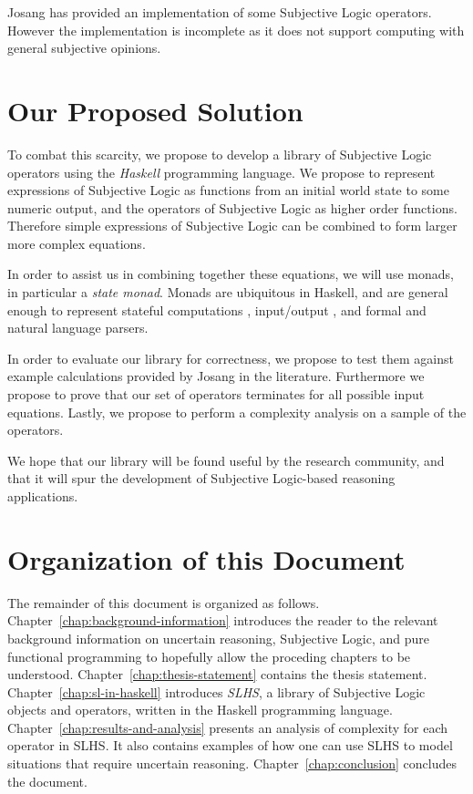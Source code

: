 \documentclass[thesis.tex]{subfiles}
\begin{document}
Josang has provided an implementation of some Subjective Logic operators.
However the implementation is incomplete as it does not support computing
with general subjective opinions.





\section{Our Proposed Solution}

To combat this scarcity, we propose to develop a library of Subjective Logic
operators using the \emph{Haskell} programming language. We propose to represent
expressions of Subjective Logic as functions from an initial world state to some
numeric output, and the operators of Subjective Logic as higher order functions.
Therefore simple expressions of Subjective Logic can be combined to form larger
more complex equations.

In order to assist us in combining together these equations, we will use monads,
in particular a \emph{state monad}. Monads are ubiquitous in Haskell, and are
general enough to represent stateful computations \cite{launchbury1994lazy},
input/output \cite{peyton1993imperative},
and formal \cite{hutton1998monadic, leijen2001parsec} and natural language
\cite{hafiz2010lazy} parsers.

In order to evaluate our library for correctness, we propose to test them against
example calculations provided by Josang in the literature. Furthermore we propose
to prove that our set of operators terminates for all possible input equations.
Lastly, we propose to perform a complexity analysis on a sample of the operators.

We hope that our library will be found useful by the research community, and that
it will spur the development of Subjective Logic-based reasoning applications.






\section{Organization of this Document}

The remainder of this document is organized as follows.
Chapter~\ref{chap:background-information}
introduces the reader to the relevant background information on uncertain reasoning,
Subjective Logic, and pure functional programming to hopefully allow the proceding
chapters to be understood. Chapter~\ref{chap:thesis-statement} contains the thesis
statement. Chapter~\ref{chap:sl-in-haskell} introduces \emph{SLHS}, a library of
Subjective Logic objects and operators, written in the Haskell programming language.
Chapter~\ref{chap:results-and-analysis} presents an analysis of complexity for each
operator in SLHS. It also contains examples of how one can use SLHS to model situations
that require uncertain reasoning. Chapter~\ref{chap:conclusion} concludes the document.
\end{document}
